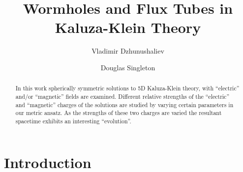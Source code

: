 %


%


%
%

\baselineskip 14pt
%
%
%
\title{Wormholes and Flux Tubes in Kaluza-Klein Theory}
\author{Vladimir Dzhunushaliev}
\address{Theor. Phys. Dept. KSNU, 720024, Bishkek, Kyrgyzstan and
Universit{\"a}t Potsdam, Institut f{\"u}r Mathematik, 14469 Potsdam,
Germany}
\author{Douglas Singleton}   %
\address{Dept. of Phys. CSU Fresno, 2345 East San Ramon Ave. M/S 37
Fresno, CA 93740-8031 USA}  %
%
\maketitle              %


\begin{abstract}        %
In this work spherically symmetric solutions to 5D Kaluza-Klein
theory, with ``electric'' and/or ``magnetic'' fields are examined.
Different relative strengths of the ``electric'' and ``magnetic''
charges of the solutions are studied by varying certain parameters
in our metric ansatz. As the strengths of these two charges
are varied the resultant spacetime exhibits an interesting ``evolution''.
\
\end{abstract}   	%



\section{Introduction}               %

